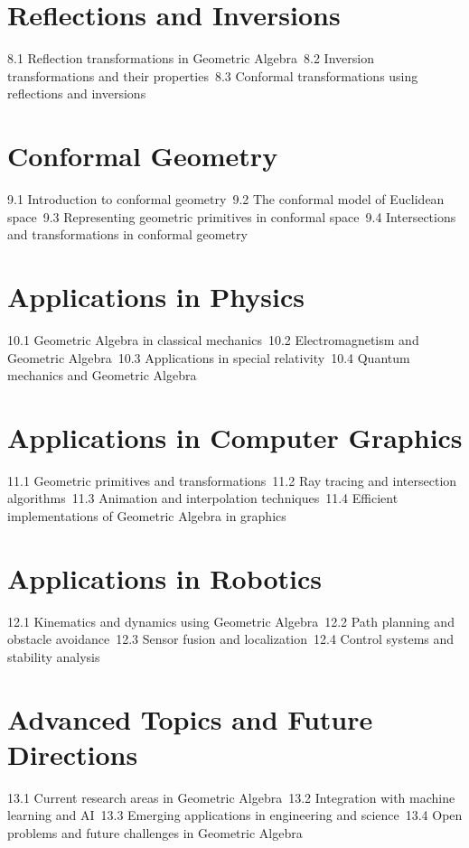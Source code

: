 \section{Reflections and Inversions}
8.1 Reflection transformations in Geometric Algebra\
8.2 Inversion transformations and their properties\
8.3 Conformal transformations using reflections and inversions\
\section{Conformal Geometry}
9.1 Introduction to conformal geometry\
9.2 The conformal model of Euclidean space\
9.3 Representing geometric primitives in conformal space\
9.4 Intersections and transformations in conformal geometry\
\section{Applications in Physics}
10.1 Geometric Algebra in classical mechanics\
10.2 Electromagnetism and Geometric Algebra\
10.3 Applications in special relativity\
10.4 Quantum mechanics and Geometric Algebra\
\section{Applications in Computer Graphics}
11.1 Geometric primitives and transformations\
11.2 Ray tracing and intersection algorithms\
11.3 Animation and interpolation techniques\
11.4 Efficient implementations of Geometric Algebra in graphics\
\section{Applications in Robotics}
12.1 Kinematics and dynamics using Geometric Algebra\
12.2 Path planning and obstacle avoidance\
12.3 Sensor fusion and localization\
12.4 Control systems and stability analysis\
\section{Advanced Topics and Future Directions}
13.1 Current research areas in Geometric Algebra\
13.2 Integration with machine learning and AI\
13.3 Emerging applications in engineering and science\
13.4 Open problems and future challenges in Geometric Algebra\
